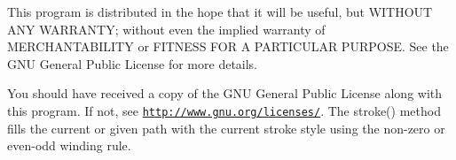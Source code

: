 This program is distributed in the hope that it will be useful, but W\+I\+T\+H\+O\+U\+T A\+N\+Y W\+A\+R\+R\+A\+N\+T\+Y; without even the implied warranty of M\+E\+R\+C\+H\+A\+N\+T\+A\+B\+I\+L\+I\+T\+Y or F\+I\+T\+N\+E\+S\+S F\+O\+R A P\+A\+R\+T\+I\+C\+U\+L\+A\+R P\+U\+R\+P\+O\+S\+E. See the G\+N\+U General Public License for more details.

You should have received a copy of the G\+N\+U General Public License along with this program. If not, see \href{http://www.gnu.org/licenses/}{\tt http\+://www.\+gnu.\+org/licenses/}. The stroke() method fills the current or given path with the current stroke style using the non-\/zero or even-\/odd winding rule. 